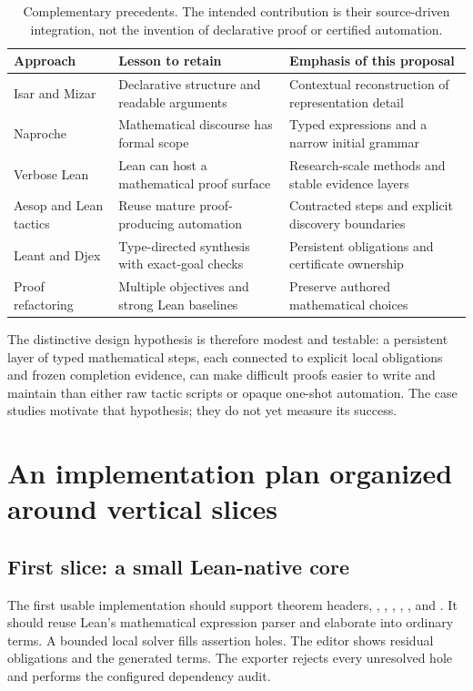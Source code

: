 \documentclass[11pt,letterpaper]{article}
\theoremstyle{definition}
\theoremstyle{remark}
\newcommand{\code}[1]{\texttt{\detokenize{#1}}}
\begin{document}
\begin{table}[htbp]
\centering\small
\begin{tabularx}{\textwidth}{@{}p{}XX@{}}
\toprule
Approach & Lesson to retain & Emphasis of this proposal\\
\midrule
Isar and Mizar & Declarative structure and readable arguments & Contextual reconstruction of representation detail\\
Naproche & Mathematical discourse has formal scope & Typed expressions and a narrow initial grammar\\
Verbose Lean & Lean can host a mathematical proof surface & Research-scale methods and stable evidence layers\\
Aesop and Lean tactics & Reuse mature proof-producing automation & Contracted steps and explicit discovery boundaries\\
Leant and Djex & Type-directed synthesis with exact-goal checks & Persistent obligations and certificate ownership\\
Proof refactoring & Multiple objectives and strong Lean baselines & Preserve authored mathematical choices\\
\bottomrule
\end{tabularx}
\caption{Complementary precedents. The intended contribution is their source-driven integration, not the invention of declarative proof or certified automation.}
\end{table}

The distinctive design hypothesis is therefore modest and testable: a persistent layer of typed mathematical steps, each connected to explicit local obligations and frozen completion evidence, can make difficult proofs easier to write and maintain than either raw tactic scripts or opaque one-shot automation. The case studies motivate that hypothesis; they do not yet measure its success.

\section{An implementation plan organized around vertical slices}
\label{sec:implementation}
\subsection{First slice: a small Lean-native core}
The first usable implementation should support theorem headers, \code{take}, \code{assume}, \code{let}, \code{fact}, \code{show}, and \code{calc}. It should reuse Lean's mathematical expression parser and elaborate into ordinary terms. A bounded local solver fills assertion holes. The editor shows residual obligations and the generated terms. The exporter rejects every unresolved hole and performs the configured dependency audit.
\end{document}

